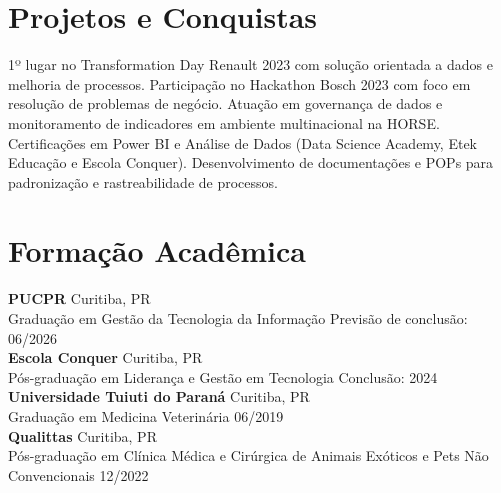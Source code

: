 \documentclass[11pt,a4paper]{article}
\begin{document}
\section{Projetos e Conquistas}

1º lugar no Transformation Day Renault 2023 com solução orientada a dados e melhoria de processos. Participação no Hackathon Bosch 2023 com foco em resolução de problemas de negócio. Atuação em governança de dados e monitoramento de indicadores em ambiente multinacional na HORSE. Certificações em Power BI e Análise de Dados (Data Science Academy, Etek Educação e Escola Conquer). Desenvolvimento de documentações e POPs para padronização e rastreabilidade de processos.

\section{Formação Acadêmica}

\textbf{PUCPR} \hfill Curitiba, PR\\
Graduação em Gestão da Tecnologia da Informação \hfill Previsão de conclusão: 06/2026\\[6pt]

\textbf{Escola Conquer} \hfill Curitiba, PR\\
Pós-graduação em Liderança e Gestão em Tecnologia \hfill Conclusão: 2024\\[6pt]

\textbf{Universidade Tuiuti do Paraná} \hfill Curitiba, PR\\
Graduação em Medicina Veterinária \hfill 06/2019\\[6pt]

\textbf{Qualittas} \hfill Curitiba, PR\\
Pós-graduação em Clínica Médica e Cirúrgica de Animais Exóticos e Pets Não Convencionais \hfill 12/2022
\end{document}
